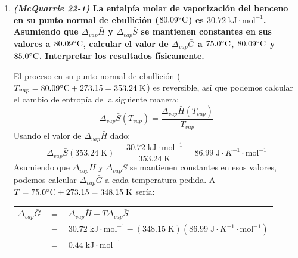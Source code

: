 \documentclass[a4paper,12pt]{article}
\begin{document}
\begin{enumerate}
De los cambios de entrop\'ia que hemos estudiado, los que involucran gases por lo general tienen mayor magnitud (como la vaporizaci\'on o expansi\'on de gases), lo que se debe al cambio de volumen considerable (comparado con un l\'iquidos o s\'olidos). Por lo que en este caso podemos enfocarnos en estudiar c\'omo cambia el volumen debido al cambio de moles de gases en las reacciones. En la primera reacci\'on se mantiene el mismo n\'umero de moles de gases ($\Delta n_{gases}=1-1=0$), en la segunda se pasa de tener dos moles a no tener moles de gases ($\Delta n_{gases}=0-2=-2$), en la tercera se pasa de tener 3 moles de gases a solo un mol de gas ($\Delta n_{gases}=1-4=-3$) y en la cuarta se pasa de tener un mol de gas a tener dos moles de gases ($\Delta n_{gases}=2-1=1$). Entre mayor sea el cambio de moles de gases, mayor ser\'a el cambio de entrop\'ia, as\'i que el orden ascendente quedar\'ia:
$$\Delta_rS^\standardstate (c)<\Delta_rS^\standardstate(b)<\Delta_rS^\standardstate (a) < \Delta_rS^\standardstate (d)$$

 \item \textbf{\textit{(McQuarrie 22-1)} La entalp\'ia molar de vaporizaci\'on del benceno en su punto normal de ebullici\'on ($80.09\celsius$) es $30.72\;\mbox{kJ}\cdot\mbox{mol}^{-1}$. Asumiendo que $\Delta_{vap}\bar{H}$ y $\Delta_{vap}\bar{S}$ se mantienen constantes en sus valores a $80.09\celsius$, calcular el valor de $\Delta_{vap}\bar{G}$ a $75.0\celsius$, $80.09\celsius$ y $85.0\celsius$. Interpretar los resultados f\'isicamente.} %

El proceso en su punto normal de ebullici\'on ($T_{vap}=80.09\celsius+273.15=353.24\;\mbox{K}$) es reversible, as\'i que podemos calcular el cambio de entrop\'ia de la siguiente manera:
$$\Delta_{vap}\bar{S}(T_{vap})=\frac{\Delta_{vap}\bar{H}(T_{vap})}{T_{vap}}$$
Usando el valor de $\Delta_{vap}\bar{H}$ dado:
$$\Delta_{vap}\bar{S}(353.24\;\mbox{K})=\frac{30.72\;\mbox{kJ}\cdot\mbox{mol}^{-1}}{353.24\;\mbox{K}}=86.99\;\mbox{J}\cdot{K}^{-1}\cdot\mbox{mol}^{-1}$$
Asumiendo que $\Delta_{vap}\bar{H}$ y $\Delta_{vap}\bar{S}$ se mantienen constantes en esos valores, podemos calcular $\Delta_{vap}\bar{G}$ a cada temperatura pedida. A $T=75.0\celsius+273.15=348.15\;\mbox{K}$ ser\'ia: \\
\begin{center}
\begin{tabular}{r c l}
$\Delta_{vap}\bar{G}$ & $=$ & $\Delta_{vap}\bar{H}-T\Delta_{vap}\bar{S}$ \\
& $=$ & $30.72\;\mbox{kJ}\cdot\mbox{mol}^{-1}-(348.15\;\mbox{K})(86.99\;\mbox{J}\cdot{K}^{-1}\cdot\mbox{mol}^{-1})$ \\
& $=$ & $0.44\;\mbox{kJ}\cdot\mbox{mol}^{-1}$
\end{tabular}
\end{center}


\end{enumerate}
\end{document}
